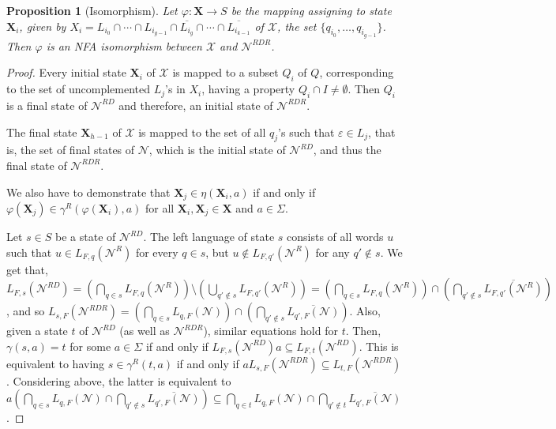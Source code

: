 \documentclass[preprint,12pt]{elsarticle}
\newcommand{\ol}{\overline}
\newcommand{\eps}{\varepsilon}
\newcommand{\emp}{\emptyset}
\newcommand{\Sig}{\Sigma}
\newcommand{\cN}{{\mathcal N}}
\newcommand{\cX}{{\mathcal X}}
\newcommand{\rev}{R}
\newcommand{\deter}{D}
\newtheorem{proposition}{Proposition}
\begin{document}
\begin{proposition}[Isomorphism]
\label{prop:isomorphism}
Let $\varphi: {\mathbf X} \to {S}$ be the mapping assigning to state 
${\mathbf X}_i$, given by
$X_i=L_{i_0}\cap\cdots\cap L_{i_{g-1}}\cap\ol{L_{i_{g}}}
\cap\cdots\cap \ol{L_{i_{k-1}}}$ of $\cX$, the set 
$\{q_{i_0},\ldots, q_{i_{g-1}}\}$.
Then $\varphi$ is an NFA isomorphism between $\cX$ and $\cN^{\rev\deter\rev}$. 
\end{proposition}
\begin{proof}
Every initial state ${\mathbf X}_i$ of $\cX$ is mapped to a subset $Q_i$ of $Q$, 
corresponding to the set of uncomplemented $L_j$'s in $X_i$, 
having a property $Q_i\cap I\ne\emp$. 
Then $Q_i$ is a final state of $\cN^{\rev\deter}$ and therefore, 
an initial state of $\cN^{\rev\deter\rev}$.

The final state ${\mathbf X}_{h -1}$ of $\cX$ is mapped to 
the set of all $q_j$'s such that $\eps\in L_j$, that is, 
the set of final states of $\cN$, 
which is the initial state of $\cN^{\rev\deter}$, 
and thus the final state of $\cN^{\rev\deter\rev}$.

We also have to demonstrate that ${\mathbf X}_j\in\eta({\mathbf X}_i,a)$ if and 
only if $\varphi({\mathbf X}_j)\in\gamma^\rev(\varphi({\mathbf X}_i),a)$
for all ${\mathbf X}_i, {\mathbf X}_j\in {\mathbf X}$ 
and $a\in\Sig$.

Let $s\in S$ be a state of $\cN^{\rev\deter}$.
The left language of state $s$ consists of all words $u$ such that 
$u\in L_{F,q}(\cN^\rev)$ for every $q\in s$, 
but $u\not\in L_{F,q'}(\cN^\rev)$ for any $q'\not\in s$.
We get that, $L_{F,s}(\cN^{\rev\deter})=
(\bigcap_{q\in s} L_{F,q}(\cN^\rev)) \setminus 
(\bigcup_{q'\not\in s} L_{F,q'}(\cN^\rev))=
(\bigcap_{q\in s} L_{F,q}(\cN^\rev)) \cap 
(\bigcap_{q'\not\in s} \ol{L_{F,q'}(\cN^\rev)})$, and so
$L_{s,F}(\cN^{\rev\deter\rev})=
(\bigcap_{q\in s} L_{q,F}(\cN)) \cap 
(\bigcap_{q'\not\in s} \ol{L_{q',F}(\cN)})$.
Also, given a state $t$ of $\cN^{\rev\deter}$ (as well as $\cN^{\rev\deter\rev}$), 
similar equations hold for $t$. 
Then, $\gamma(s,a)=t$ for some $a\in\Sig$ if and only if
$L_{F,s}(\cN^{\rev\deter})a\subseteq L_{F,t}(\cN^{\rev\deter})$.
This is equivalent to having $s\in\gamma^\rev(t,a)$ if and only if
$aL_{s,F}(\cN^{\rev\deter\rev})\subseteq L_{t,F}(\cN^{\rev\deter\rev})$.
Considering above, the latter is equivalent to
$a(\bigcap_{q\in s} L_{q,F}(\cN) \cap \bigcap_{q'\not\in s} \ol{L_{q',F}(\cN)})
\subseteq \bigcap_{q\in t} L_{q,F}(\cN) \cap \bigcap_{q'\not\in t} \ol{L_{q',F}(\cN)}$.


\end{proof}
\end{document}
